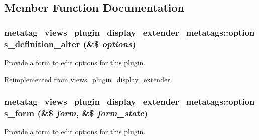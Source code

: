 \subsection{Member Function Documentation}
\hypertarget{classmetatag__views__plugin__display__extender__metatags_abde4b6c185453983c25a43ceed776603}{
\subsubsection[{options\_\-definition\_\-alter}]{\setlength{\rightskip}{0pt plus 5cm}metatag\_\-views\_\-plugin\_\-display\_\-extender\_\-metatags::options\_\-definition\_\-alter (\&\$ {\em options})}}
\label{classmetatag__views__plugin__display__extender__metatags_abde4b6c185453983c25a43ceed776603}
Provide a form to edit options for this plugin. 

Reimplemented from \hyperlink{classviews__plugin__display__extender_a684077b715aa9ddce09d223544b7263c}{views\_\-plugin\_\-display\_\-extender}.\hypertarget{classmetatag__views__plugin__display__extender__metatags_a546520f911ecde644d594b6231aabb3a}{
\subsubsection[{options\_\-form}]{\setlength{\rightskip}{0pt plus 5cm}metatag\_\-views\_\-plugin\_\-display\_\-extender\_\-metatags::options\_\-form (\&\$ {\em form}, \/  \&\$ {\em form\_\-state})}}
\label{classmetatag__views__plugin__display__extender__metatags_a546520f911ecde644d594b6231aabb3a}
Provide a form to edit options for this plugin. 

